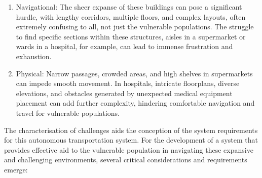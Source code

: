 \documentclass[9pt,conference]{IEEEtran}
\begin{document}
\begin{enumerate}[label=\alph*.]
    \item Navigational: The sheer expanse of these buildings can pose a significant hurdle, with lengthy corridors, multiple floors, and complex layouts, often extremely confusing to all, not just the vulnerable populations. The struggle to find specific sections within these structures, aisles in a supermarket or wards in a hospital, for example, can lead to immense frustration and exhaustion.
    \item Physical: Narrow passages, crowded areas, and high shelves in supermarkets can impede smooth movement. In hospitals, intricate floorplans, diverse elevations, and obstacles generated by unexpected medical equipment placement can add further complexity, hindering comfortable navigation and travel for vulnerable populations.
\end{enumerate}

The characterisation of challenges aids the conception of the system requirements for this autonomous transportation system. For the development of a system that provides effective aid to the vulnerable population in navigating these expansive and challenging environments, several critical considerations and requirements emerge:
\end{document}
